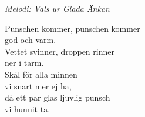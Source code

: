 {\footnotesize\textit{Melodi: Vals ur Glada Änkan}}\par
\vspace{10pt}
Punschen kommer, punschen kommer\\
god och varm.\\
Vettet svinner, droppen rinner\\
ner i tarm.\\
Skål för alla minnen\\
vi snart mer ej ha,\\
då ett par glas ljuvlig punsch\\
vi hunnit ta.

